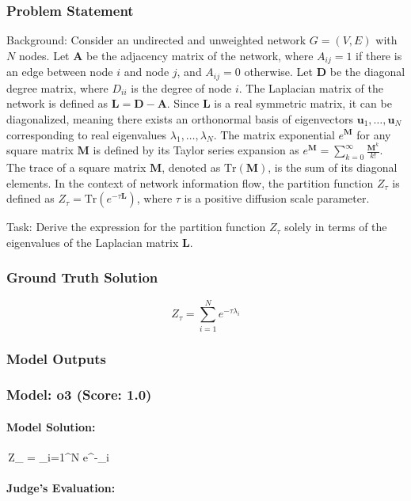 \documentclass[10pt]{article}
\begin{document}
\subsubsection*{Problem Statement}
Background:
Consider an undirected and unweighted network $G=(V,E)$ with $N$ nodes. Let $\mathbf{A}$ be the adjacency matrix of the network, where $A_{ij}=1$ if there is an edge between node $i$ and node $j$, and $A_{ij}=0$ otherwise. Let $\mathbf{D}$ be the diagonal degree matrix, where $D_{ii}$ is the degree of node $i$. The Laplacian matrix of the network is defined as $\mathbf{L = D - A}$. Since $\mathbf{L}$ is a real symmetric matrix, it can be diagonalized, meaning there exists an orthonormal basis of eigenvectors $\mathbf{u}_1, \dots, \mathbf{u}_N$ corresponding to real eigenvalues $\lambda_1, \dots, \lambda_N$. The matrix exponential $e^{\mathbf{M}}$ for any square matrix $\mathbf{M}$ is defined by its Taylor series expansion as $e^{\mathbf{M}} = \sum_{k=0}^{\infty} \frac{\mathbf{M}^k}{k!}$. The trace of a square matrix $\mathbf{M}$, denoted as $\text{Tr}(\mathbf{M})$, is the sum of its diagonal elements. In the context of network information flow, the partition function $Z_{\tau}$ is defined as $Z_{\tau} = \text{Tr}(e^{-\tau \mathbf{L}})$, where $\tau$ is a positive diffusion scale parameter.

Task:
Derive the expression for the partition function $Z_{\tau}$ solely in terms of the eigenvalues of the Laplacian matrix $\mathbf{L}$.

\subsubsection*{Ground Truth Solution}
\[ \boxed{Z_{\tau} = \sum_{i=1}^N e^{-\tau \lambda_i}} \]

\subsubsection*{Model Outputs}
\subsubsection*{Model: o3 (Score: 1.0)}
\paragraph*{Model Solution:}
\,Z_{\tau} = \sum_{i=1}^{N} e^{-\tau \lambda_i}\,

\paragraph*{Judge's Evaluation:}
\end{document}
